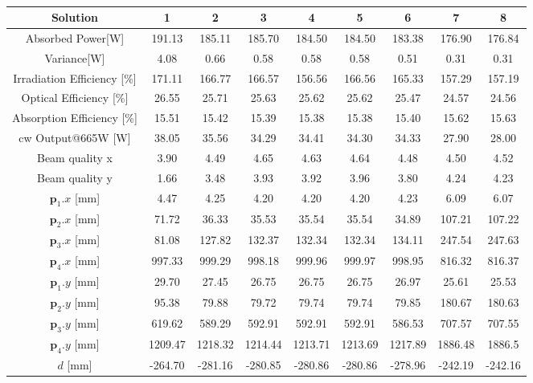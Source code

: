 \documentclass[a4paper,10pt]{article}
\renewcommand{\vec}[1]{\mathbf{#1}}
\begin{document}
    \begin{table}
    \centering
    \setlength\tabcolsep{2pt}
    \renewcommand{\arraystretch}{1.5}
    \begin{tabular}{| c | c | c | c | c | c | c | c | c |}
        \hline
        Solution      &1&2&3&4&5&6&7&8\\
        \hline
        Absorbed Power[W] &191.13&185.11&185.70&184.50&184.50&183.38&176.90&176.84\\
        \hline
        Variance[W] &4.08&0.66&0.58&0.58&0.58&0.51&0.31&0.31\\
        \hline
        Irradiation Efficiency [\%]&171.11&166.77&166.57&156.56&166.56&165.33&157.29&157.19\\
        \hline
        Optical Efficiency [\%]&26.55&25.71&25.63&25.62&25.62&25.47&24.57&24.56\\
        \hline
        Absorption Efficiency [\%]&15.51&15.42&15.39&15.38&15.38&15.40&15.62&15.63\\
        \hline
        cw Output@665W [W]  &38.05&35.56&34.29&34.41&34.30&34.33&27.90&28.00\\
        \hline
        Beam quality x&3.90&4.49&4.65&4.63&4.64&4.48&4.50&4.52\\
        \hline
        Beam quality y&1.66&3.48&3.93&3.92&3.96&3.80&4.24&4.23\\
        \hline
        $\vec{p}_1.x$ [mm]&4.47&4.25&4.20&4.20&4.20&4.23&6.09&6.07\\
        \hline
        $\vec{p}_2.x$ [mm]&71.72&36.33&35.53&35.54&35.54&34.89&107.21&107.22\\
        \hline
        $\vec{p}_3.x$ [mm]&81.08&127.82&132.37&132.34&132.34&134.11&247.54&247.63\\ 
        \hline
        $\vec{p}_4.x$ [mm]&997.33&999.29&998.18&999.96&999.97&998.95&816.32&816.37\\ 
        \hline
        $\vec{p}_1.y$ [mm]&29.70&27.45&26.75&26.75&26.75&26.97&25.61&25.53\\
        \hline
        $\vec{p}_2.y$ [mm]&95.38&79.88&79.72&79.74&79.74&79.85&180.67&180.63\\
        \hline
        $\vec{p}_3.y$ [mm]&619.62&589.29&592.91&592.91&592.91&586.53&707.57&707.55\\ 
        \hline
        $\vec{p}_4.y$ [mm]&1209.47&1218.32&1214.44&1213.71&1213.69&1217.89&1886.48&1886.5\\ 
        \hline
        $d$           [mm]&-264.70&-281.16&-280.85&-280.86&-280.86&-278.96&-242.19&-242.16\\
        \hline
    \end{tabular}
    \label{tab:setup2_results_pipe}
    \caption[]{}
    \end{table}
\end{document}
